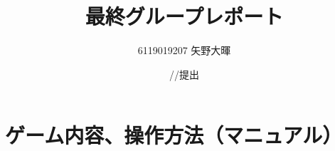 \documentclass{jarticle}
\title{最終グループレポート}
\author{6119019207 矢野大暉}
\date{\number\year/\number\month/\number\day 提出}
\begin{document}
\maketitle

\section{ゲーム内容、操作方法（マニュアル）}
%
%
%
%
%
%
\end{document}
